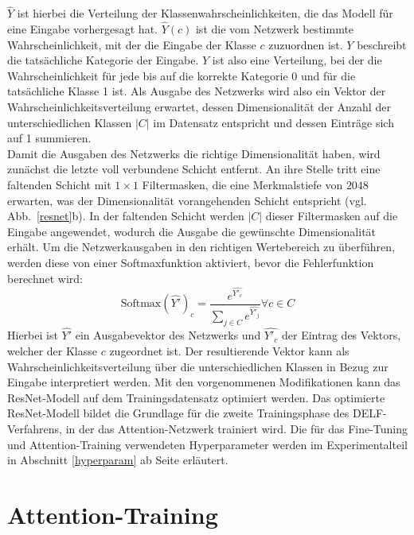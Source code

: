 $\hat{Y}$ ist hierbei die Verteilung der Klassenwahrscheinlichkeiten, die das Modell für eine Eingabe vorhergesagt hat. $\hat{Y}(c)$ ist die vom Netzwerk bestimmte Wahrscheinlichkeit, mit der die Eingabe der Klasse $c$ zuzuordnen ist. $Y$ beschreibt die tatsächliche Kategorie der Eingabe. $Y$ ist also eine Verteilung, bei der die Wahrscheinlichkeit für jede bis auf die korrekte Kategorie 0 und für die tatsächliche Klasse 1 ist. Als Ausgabe des Netzwerks wird also ein Vektor der Wahrscheinlichkeitsverteilung erwartet, dessen Dimensionalität der Anzahl der unterschiedlichen Klassen $|C|$ im Datensatz entspricht und dessen Einträge sich auf 1 summieren. \\
Damit die Ausgaben des Netzwerks die richtige Dimensionalität haben, wird zunächst die letzte voll verbundene Schicht entfernt. An ihre Stelle tritt eine faltenden Schicht mit $1\times1$ Filtermasken, die eine Merkmalstiefe von $2048$ erwarten, was der Dimensionalität vorangehenden Schicht entspricht (vgl. Abb.~\ref{resnet}b). In der faltenden Schicht werden $|C|$ dieser Filtermasken auf die Eingabe angewendet, wodurch die Ausgabe die gewünschte Dimensionalität erhält.
Um die Netzwerkausgaben in den richtigen Wertebereich zu überführen, werden diese von einer Softmaxfunktion aktiviert, bevor die Fehlerfunktion berechnet wird:
\begin{equation}
\text{Softmax}(\hat{Y'})_{c} = \frac{e^{\hat{Y'_c}}}{\sum_{ j \in C}{e^{\hat{Y'_j}}}} \forall c \in C
\end{equation}
Hierbei ist $\hat{Y'}$ ein Ausgabevektor des Netzwerks und $\hat{Y'_c}$ der Eintrag des Vektors, welcher der Klasse $c$ zugeordnet ist. Der resultierende Vektor kann als Wahrscheinlichkeitsverteilung über die unterschiedlichen Klassen in Bezug zur Eingabe interpretiert werden. Mit den vorgenommenen Modifikationen kann das ResNet-Modell auf dem Trainingsdatensatz optimiert werden. Das optimierte ResNet-Modell bildet die Grundlage für die zweite Trainingsphase des DELF-Verfahrens, in der das Attention-Netzwerk trainiert wird. Die für das Fine-Tuning und Attention-Training verwendeten Hyperparameter werden im Experimentalteil in Abschnitt \ref{hyperparam} ab Seite \pageref{hyperparam} erläutert.

\section{Attention-Training}

